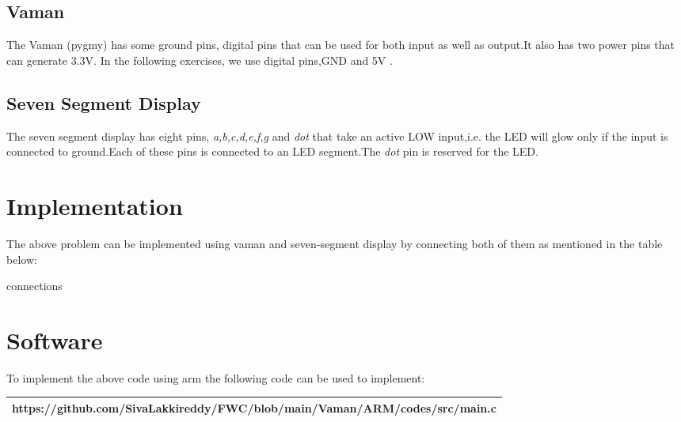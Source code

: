 \documentclass[10pt,a4paper]{article}
\begin{document}
\subsection{Vaman} 
The Vaman (pygmy) has some ground pins, digital pins that can be used for both input as well as output.It also has two power pins that can generate 3.3V. In the following exercises, we use digital pins,GND and 5V .
\subsection{Seven Segment Display}
The seven segment display has eight pins, \emph{a,b,c,d,e,f,g} and \emph{dot} that take an active LOW input,i.e. the LED will glow only if the input is connected to ground.Each of these pins is connected to an LED segment.The \emph{dot} pin is reserved for the LED.
\section{Implementation}
The above problem can be implemented using vaman and seven-segment display by connecting both of them as mentioned in the table below:
   \begin{table}[h]
	   \begin{center}
		   
		   \caption{connections}
		   \label{table:3}
	   \end{center}
   \end{table}  
         
\section{Software}
To implement the above code using arm the following code can be used to implement:

   \begin{tabularx}{1\textwidth} { 
  | >{\centering\arraybackslash}X |}
  \hline
  https://github.com/SivaLakkireddy/FWC/blob/main/Vaman/ARM/codes/src/main.c\\
  \hline
\end{tabularx}



\end{document}
